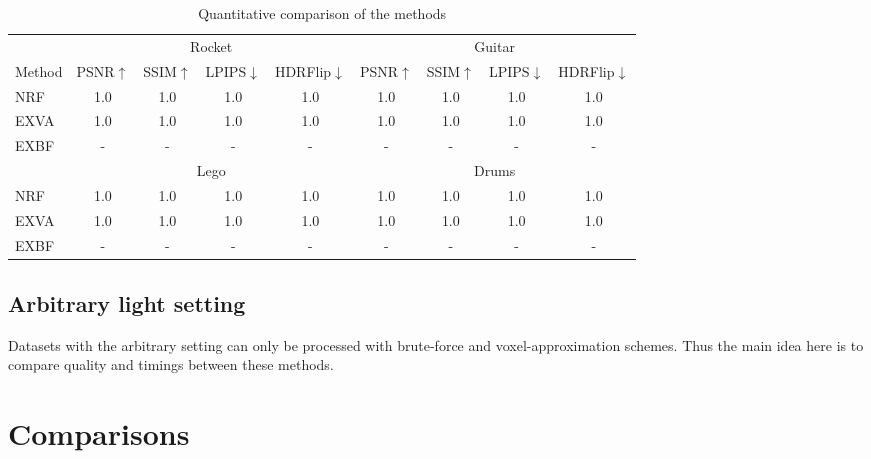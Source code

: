 \begin{table}[!htb]
    \centering
    \caption{Quantitative comparison of the methods}
    \label{tab:colocated_metrics}
    \begin{tabular*}{\textwidth}{ l | c c c c | c c c c}
        & \multicolumn{4}{c}{Rocket} & \multicolumn{4}{c}{Guitar} \\
    	Method & PSNR$\uparrow$ & SSIM$\uparrow$ & LPIPS$\downarrow$ & HDRFlip$\downarrow$ & PSNR$\uparrow$ & SSIM$\uparrow$ & LPIPS$\downarrow$ & HDRFlip$\downarrow$ \\
        \midrule
        NRF & 1.0 & 1.0 & 1.0 & 1.0 & 1.0 & 1.0 & 1.0 & 1.0 \\
        EXVA & 1.0 & 1.0 & 1.0 & 1.0 & 1.0 & 1.0 & 1.0 & 1.0 \\
        EXBF & - & - & - & - & - & - & - & - \\
        \midrule
        & \multicolumn{4}{c}{Lego} & \multicolumn{4}{c}{Drums} \\
        \midrule
        NRF & 1.0 & 1.0 & 1.0 & 1.0 & 1.0 & 1.0 & 1.0 & 1.0 \\
        EXVA & 1.0 & 1.0 & 1.0 & 1.0 & 1.0 & 1.0 & 1.0 & 1.0 \\
        EXBF & - & - & - & - & - & - & - & - \\
    \end{tabular*}
\end{table}


\subsection{Arbitrary light setting}

Datasets with the arbitrary setting can only be processed with brute-force and voxel-approximation schemes.
Thus the main idea here is to compare quality and timings between these methods.





\section{Comparisons}

